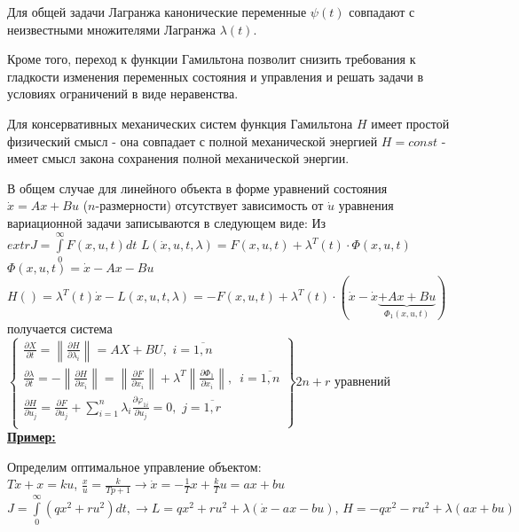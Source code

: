 \documentclass[preprint,russian,a5paper,10pt,twoside,mediummath]{ncc}
\newcommand{\ExampleMy}{\vspace{\baselineskip}\textbf{\underline{Пример:}}\nopagebreak\par}
\begin{document}
\par Для общей задачи Лагранжа канонические переменные $\psi \left( t \right)$ совпадают с неизвестными множителями Лагранжа $\lambda \left( t \right)$.
\par Кроме того, переход к функции Гамильтона позволит снизить требования к гладкости изменения переменных состояния и управления и решать задачи в условиях ограничений в виде неравенства.
\par Для консервативных механических систем функция Гамильтона $H$ имеет простой физический смысл - она совпадает с полной механической энергией $H=const$ - имеет смысл закона сохранения полной механической энергии.
\par В общем случае для линейного объекта в форме уравнений состояния $\dot{x}=Ax+Bu$ ($n$-размерности) отсутствует зависимость от $\dot{u}$ уравнения вариационной задачи записываются в следующем виде:
Из $extrJ=\int\limits_{0}^{\infty }{F\left( x,u,t \right)dt}$
$L\left( \dot{x},u,t,\lambda  \right)=F\left( x,u,t \right)+{{\lambda }^{T}}\left( t \right)\cdot \Phi \left( x,u,t \right)$ $\Phi \left( x,u,t \right)=\dot{x}-Ax-Bu$
\\$H\left( {} \right)={{\lambda }^{T}}\left( t \right)\dot{x}-L\left( x,u,t,\lambda  \right)=-F\left( x,u,t \right)+{{\lambda }^{T}}\left( t \right)\cdot \left( \dot{x}-\dot{x}\underbrace{+Ax+Bu}_{{{\Phi }_{1}}\left( x,u,t \right)} \right)$
получается система 
\\$\left\{ \left. \begin{array}{*{35}{l}}
   \frac{\partial X}{\partial t}=\left\| \frac{\partial H}{\partial {{\lambda }_{i}}} \right\|=AX+BU,\,\,i=\overline{1,n}  \\
   \frac{\partial \lambda }{\partial t}=-\left\| \frac{\partial H}{\partial {{x}_{i}}} \right\|=\left\| \frac{\partial F}{\partial {{x}_{i}}} \right\|+{{\lambda }^{T}}\left\| \frac{\partial {{\Phi }_{1}}}{\partial {{x}_{i}}} \right\|,\,\,\,i=\overline{1,n}  \\
   \frac{\partial H}{\partial {{u}_{j}}}=\frac{\partial F}{\partial {{u}_{j}}}+\sum\limits_{i=1}^{n}{{{\lambda }_{i}}\frac{\partial {{\varphi }_{1i}}}{\partial {{u}_{j}}}}=0,\,\,j=\overline{1,r}  \\
\end{array} \right\} \right.2n+r$ уравнений
\\
\ExampleMy Определим оптимальное управление объектом:
\\$T\dot{x}+x=ku$, $\frac{x}{u}=\frac{k}{Tp+1}\to \dot{x}=-\frac{1}{T}x+\frac{k}{T}u=ax+bu$
\\$J=\int\limits_{0}^{\infty }{\left( q{{x}^{2}}+r{{u}^{2}} \right)}dt,\to L=q{{x}^{2}}+r{{u}^{2}}+\lambda \left( \dot{x}-ax-bu \right),\,H=-q{{x}^{2}}-r{{u}^{2}}+\lambda \left( ax+bu \right)$
\end{document}
